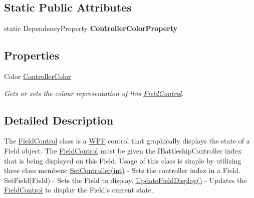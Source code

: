 \subsection*{Static Public Attributes}
\begin{DoxyCompactItemize}
\item 
\hypertarget{class_m_b_c_1_1_app_1_1_w_p_f_1_1_field_control_a22678546fbb0ccc55e06cc2f0d9dcd37}{static Dependency\-Property {\bfseries Controller\-Color\-Property}}\label{class_m_b_c_1_1_app_1_1_w_p_f_1_1_field_control_a22678546fbb0ccc55e06cc2f0d9dcd37}

\end{DoxyCompactItemize}
\subsection*{Properties}
\begin{DoxyCompactItemize}
\item 
\hypertarget{class_m_b_c_1_1_app_1_1_w_p_f_1_1_field_control_ae608f81c79edd50c22d3bd20ce824c96}{Color \hyperlink{class_m_b_c_1_1_app_1_1_w_p_f_1_1_field_control_ae608f81c79edd50c22d3bd20ce824c96}{Controller\-Color}}\label{class_m_b_c_1_1_app_1_1_w_p_f_1_1_field_control_ae608f81c79edd50c22d3bd20ce824c96}

\begin{DoxyCompactList}\small\item\em Gets or sets the colour representation of this \hyperlink{class_m_b_c_1_1_app_1_1_w_p_f_1_1_field_control}{Field\-Control}.\end{DoxyCompactList}\end{DoxyCompactItemize}


\subsection{Detailed Description}
The \hyperlink{class_m_b_c_1_1_app_1_1_w_p_f_1_1_field_control}{Field\-Control} class is a \hyperlink{namespace_m_b_c_1_1_app_1_1_w_p_f}{W\-P\-F} control that graphically displays the state of a Field object. The \hyperlink{class_m_b_c_1_1_app_1_1_w_p_f_1_1_field_control}{Field\-Control} must be given the I\-Battleship\-Controller index that is being displayed on this Field. Usage of this class is simple by utilizing three class members\-: \hyperlink{class_m_b_c_1_1_app_1_1_w_p_f_1_1_field_control_abdf9f4f572eb3f9f84caee3b0a9729a1}{Set\-Controller(int)} -\/ Sets the controller index in a Field. Set\-Field(\-Field) -\/ Sets the Field to display. \hyperlink{class_m_b_c_1_1_app_1_1_w_p_f_1_1_field_control_a5f73d69fb63c3fa2e03b145d66f914b6}{Update\-Field\-Display()} -\/ Updates the \hyperlink{class_m_b_c_1_1_app_1_1_w_p_f_1_1_field_control}{Field\-Control} to display the Field's current state. 

